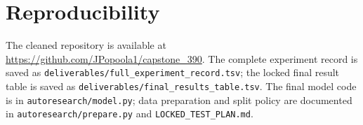 \documentclass{article}
\begin{document}
\section{Reproducibility}
The cleaned repository is available at \url{https://github.com/JPopoola1/capstone_390}. The complete experiment record is saved as \texttt{deliverables/full\_experiment\_record.tsv}; the locked final result table is saved as \texttt{deliverables/final\_results\_table.tsv}. The final model code is in \texttt{autoresearch/model.py}; data preparation and split policy are documented in \texttt{autoresearch/prepare.py} and \texttt{LOCKED\_TEST\_PLAN.md}.
\end{document}
